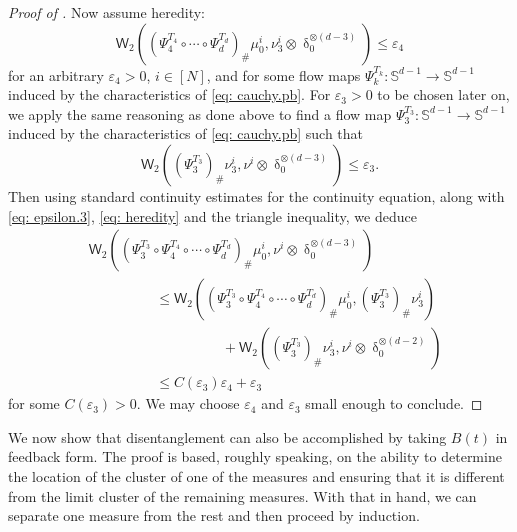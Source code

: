 \documentclass[a4paper,11pt]{article}
\theoremstyle{plain}
\renewcommand{\S}{\mathbb{S}^{d-1}}
\newcommand{\bB}{\bm{\mathit{B}}}
\renewcommand{\leq}{\leqslant}
\numberwithin{equation}{section}
\begin{document}
\begin{proof}[Proof of ]
Now assume heredity: 
\begin{equation} \label{eq: heredity}
\mathsf{W}_2\left(\left(\Psi_4^{T_4}\circ\cdots\circ \Psi_d^{T_d}\right)_{\#}\mu_0^i,\nu^i_{3}\otimes\updelta^{\otimes(d-3)}_0\right)\leq\varepsilon_{4}
\end{equation}
for an arbitrary $\varepsilon_4>0$, $i\in[N]$, and for some flow maps $\Psi_k^{T_k}:\S\to\S$ induced by the characteristics of \eqref{eq: cauchy.pb}.
For $\varepsilon_3>0$ to be chosen later on, we apply the same reasoning as done above to find a flow map $\Psi_3^{T_3}:\S\to\S$ induced by the characteristics of \eqref{eq: cauchy.pb} such that
\begin{equation} \label{eq: epsilon.3}
\mathsf{W}_2\left(\left(\Psi_3^{T_3}\right)_\# \nu_{3}^i, \nu^i\otimes\updelta_0^{\otimes(d-3)}\right)\leq\varepsilon_3.
\end{equation}
Then using standard continuity estimates for the continuity equation, along with \eqref{eq: epsilon.3}, \eqref{eq: heredity} and the triangle inequality, we deduce
\begin{align*}
&\mathsf{W}_2\left(\left(\Psi_3^{T_3}\circ\Psi_4^{T_4}\circ\cdots\circ \Psi_d^{T_d}\right)_{\#}\mu_0^i,\nu^i\otimes\updelta^{\otimes(d-3)}_0\right)\\
&\hspace{2cm}\leq\mathsf{W}_2\left(\left(\Psi_3^{T_3}\circ \Psi_4^{T_4}\circ\cdots\circ\Psi_d^{T_d}\right)_{\#}\mu_0^i, \left(\Psi_3^{T_3}\right)_\# \nu_{3}^i\right) \\
&\hspace{4cm} + \mathsf{W}_2\left(\left(\Psi_3^{T_3}\right)_\# \nu_{3}^i, \nu^i\otimes\updelta_0^{\otimes(d-2)} \right)\\
&\hspace{2cm}\leq C({\varepsilon_3}) \varepsilon_4 + \varepsilon_3
\end{align*}
    for some $C({\varepsilon_3})>0$. We may choose $\varepsilon_4$ and $\varepsilon_3$ small enough to conclude.
\end{proof}


We now show that disentanglement can also be accomplished by taking $\bB(t)$ in feedback form. The proof is based, roughly speaking, on the ability to determine the location of the cluster of one of the measures and ensuring that it is different from the limit cluster of the remaining measures. With that in hand, we can separate one measure from the rest and then proceed by induction.
\end{document}
